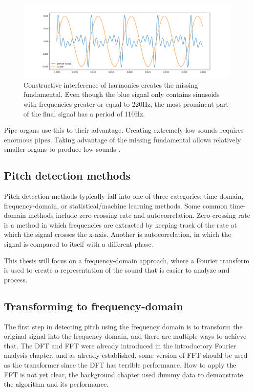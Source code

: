 \begin{figure}[ht]
    \centering
    \includegraphics[width=\textwidth]{./images/missingfund.png}
    \caption{Constructive interference of harmonics creates the missing fundamental. Even though the blue signal only contains sinusoids with frequencies greater or equal to 220Hz, the most prominent part of the final signal has a period of 110Hz. \label{fig:missingfund}}
\end{figure}

Pipe organs use this to their advantage. Creating extremely low sounds requires enormous pipes. Taking advantage of the missing fundamental allows relatively smaller organs to produce low sounds \cite{Veritasium2024}.

\subsection{Pitch detection methods}
Pitch detection methods typically fall into one of three categories: time-domain, frequency-domain, or statistical/machine learning methods. Some common time-domain methods include zero-crossing rate and autocorrelation. Zero-crossing rate is a method in which frequencies are extracted by keeping track of the rate at which the signal crosses the x-axis. Another is autocorrelation, in which the signal is compared to itself with a different phase. 

This thesis will focus on a frequency-domain approach, where a Fourier transform is used to create a representation of the sound that is easier to analyze and process.

\subsection{Transforming to frequency-domain}
The first step in detecting pitch using the frequency domain is to transform the original signal into the frequency domain, and there are multiple ways to achieve that. The DFT and FFT were already introduced in the introductory Fourier analysis chapter, and as already established, some version of FFT should be used as the transformer since the DFT has terrible performance. How to apply the FFT is not yet clear, the background chapter used dummy data to demonstrate the algorithm and its performance. 

